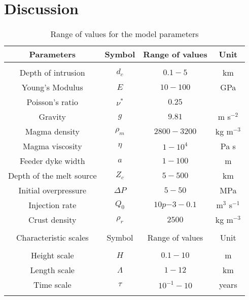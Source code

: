 \section{Discussion}
\label{C2-sec:discussion}


\begin{table}
  \caption{Range of values for the model parameters}
  \centering
  \begin{tabular}{c|c|c|c}
    \hline
    Parameters& Symbol & Range of values &Unit\\
    \hline
              &&\\
    Depth of intrusion & $d_c$ & $0.1-5$ &km \\
    Young's Modulus & $E$ & $10-100$ &GPa \\
    Poisson's ratio & $\nu^*$ & $0.25$ &\\
    Gravity & $g$ & $9.81$ &m s$^{-2}$ \\
    Magma density & $\rho_{m}$ & $2800-3200$ &kg m$^{-3}$ \\
    Magma viscosity & $\eta $ & $1-10^{4}$ &Pa s \\
    Feeder dyke width & $a$ & $1-100$ &m \\
    Depth of the melt source & $Z_{c}$ & $ 5-500$& km \\ 
    Initial overpressure & $\Delta P$ & $5-50$ &MPa \\
    Injection rate & $Q_{0}$ &$10p{-3}-0.1$ &m$^{3}$ s$^{-1}$ \\
    Crust density & $\rho_{r}$ & $2500$ &kg m$^{-3}$ \\
              &&\\
    \hline
    Characteristic scales & Symbol & Range of values & Unit\\
    \hline
              &&\\
    Height scale & $H$& $0.1-10$ &m \\
    Length scale & $\Lambda$ & $1-12$& km \\
    Time scale & $\tau$ & $10^{-1}-10$ &years \\
                                              \label{tab2}
  \end{tabular} 
\end{table}
